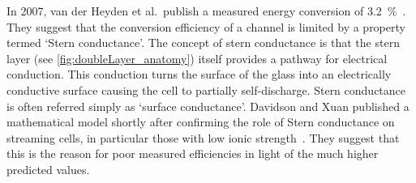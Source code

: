   In 2007, van der Heyden et al.\ publish a measured energy conversion of \SI{3.2}{\percent}~\cite{Heyden2007}.
  They suggest that the conversion efficiency of a channel is limited by a property termed `Stern conductance'.
  The concept of stern conductance is that the stern layer (see \cref{fig:doubleLayer_anatomy}) itself provides a pathway for electrical conduction.
  This conduction turns the surface of the glass into an electrically conductive surface causing the cell to partially self-discharge.
  Stern conductance is often referred simply as `surface conductance'.
  Davidson and Xuan published a mathematical model shortly after confirming the role of Stern conductance on streaming cells, in particular those with low ionic strength~\cite{Davidson2008}.
  They suggest that this is the reason for poor measured efficiencies in light of the much higher predicted values.

